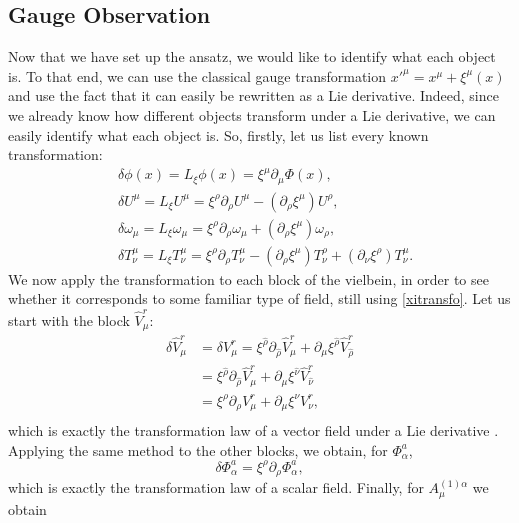 \documentclass{article}
\begin{document}
\subsection{Gauge Observation} \label{part:gaugeviel}
Now that we have set up the ansatz, we would like to identify what each object is. To that end, we can use the classical gauge transformation $x'^\mu = x^\mu + \xi^\mu(x)$ and use the fact that it can easily be rewritten as a Lie derivative.
Indeed, since we already know how different objects transform under a Lie derivative, we can easily identify what each object is.
So, firstly, let us list every known transformation:
 \begin{align} \label{xitransfo}
    &\delta \phi(x) =L_\xi \phi(x) = \xi ^ \mu \partial _ \mu \Phi (x), \\
    &\delta U ^ \mu  =L_\xi U ^ \mu = \xi ^ \rho \partial _ \rho U ^ \mu - (\partial _ \rho \xi ^ \mu) U ^\rho, \\
    &\delta  \omega _ \mu  =L_\xi \omega _ \mu  =  \xi ^ \rho \partial _ \rho \omega _\mu + (\partial _ \rho \xi ^ \mu) \omega _\rho, \\
    &\delta T ^ \mu _ \nu  =L_\xi T ^ \mu _ \nu =\xi ^ \rho  \partial _ \rho T ^ \mu _ \nu -(\partial _ \rho \xi ^ \mu ) T ^ \rho _ \nu + (\partial _ \nu \xi ^ \rho)T ^ \mu _ \nu. 
\end{align} 
We now apply the transformation to each block of the vielbein, in order to see whether it corresponds to some familiar type of field, still using \eqref{xitransfo}. Let us start with the block $\hat V^r_\mu$:
\begin{align*}
    \delta \hat V^r_\mu &= \delta V^r_\mu=  \xi^{\hat \rho}  \partial_{\hat \rho} \hat V^{ r}_{ \mu} + \partial_{ \mu} \xi^{ \hat \rho} \hat V^{  r}_{\hat \rho} \\
   &=  \xi^{\hat \rho}  \partial_{\hat \rho} \hat V^{ r}_{ \mu} + \partial_{ \mu} \xi^{ \hat \nu} \hat V^{  r}_{\hat \nu}\\
   &=  \xi^{ \rho}  \partial_{ \rho}  V^{ r}_{ \mu} + \partial_{ \mu} \xi^{  \nu}  V^{  r}_{ \nu},\\
\end{align*}
which is exactly the transformation law of a vector field under a Lie derivative \cite{freedman2012supergravity}. Applying the same method to the other blocks, we obtain, for $\Phi^a_\alpha$,
\begin{equation*}
    \delta \Phi^a_\alpha = \xi^\rho \partial_\rho \Phi^a_\alpha,
\end{equation*}
which is exactly the transformation law of a scalar field. Finally, for $A^{(1)\alpha}_\mu$ we obtain
\end{document}
